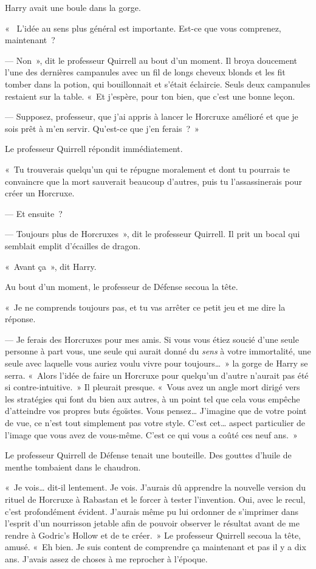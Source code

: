 Harry avait une boule dans la gorge.

«~ L'idée au sens plus général est importante. Est-ce que vous comprenez, maintenant~?

--- Non~», dit le professeur Quirrell au bout d'un moment. Il broya doucement l'une des dernières campanules avec un fil de longs cheveux blonds et les fit tomber dans la potion, qui bouillonnait et s'était éclaircie. Seuls deux campanules restaient sur la table. «~Et j'espère, pour ton bien, que c'est une bonne leçon.

--- Supposez, professeur, que j'ai appris à lancer le Horcruxe amélioré et que je sois prêt à m'en servir. Qu'est-ce que j'en ferais~?~»

Le professeur Quirrell répondit immédiatement.

«~Tu trouverais quelqu'un qui te répugne moralement et dont tu pourrais te convaincre que la mort sauverait beaucoup d'autres, puis tu l'assassinerais pour créer un Horcruxe.

--- Et ensuite~?

--- Toujours plus de Horcruxes~», dit le professeur Quirrell. Il prit un bocal qui semblait emplit d'écailles de dragon.

«~Avant ça~», dit Harry.

Au bout d'un moment, le professeur de Défense secoua la tête.

«~Je ne comprends toujours pas, et tu vas arrêter ce petit jeu et me dire la réponse.

--- Je ferais des Horcruxes pour mes amis. Si vous vous étiez soucié d'une seule personne à part vous, une seule qui aurait donné du \emph{sens} à votre immortalité, une seule avec laquelle vous auriez voulu vivre pour toujours…~» la gorge de Harry se serra. «~Alors l'idée de faire un Horcruxe pour quelqu'un d'autre n'aurait pas été si contre-intuitive.~» Il pleurait presque. «~Vous avez un angle mort dirigé vers les stratégies qui font du bien aux autres, à un point tel que cela vous empêche d'atteindre vos propres buts égoïstes. Vous pensez… J'imagine que de votre point de vue, ce n'est tout simplement pas votre style. C'est cet… aspect particulier de l'image que vous avez de vous-même. C'est ce qui vous a coûté ces neuf ans.~»

Le professeur Quirrell de Défense tenait une bouteille. Des gouttes d'huile de menthe tombaient dans le chaudron.

«~Je vois… dit-il lentement. Je vois. J'aurais dû apprendre la nouvelle version du rituel de Horcruxe à Rabastan et le forcer à tester l'invention. Oui, avec le recul, c'est profondément évident. J'aurais même pu lui ordonner de s'imprimer dans l'esprit d'un nourrisson jetable afin de pouvoir observer le résultat avant de me rendre à Godric's Hollow et de te créer.~» Le professeur Quirrell secoua la tête, amusé. «~Eh bien. Je suis content de comprendre ça maintenant et pas il y a dix ans. J'avais assez de choses à me reprocher à l'époque.


